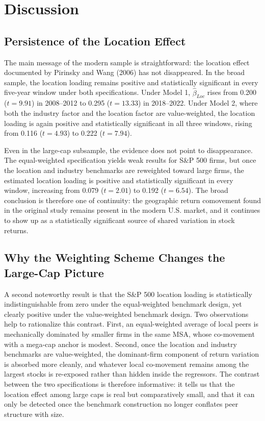 \documentclass[
  12pt,
]{article}
\begin{document}
\section{Discussion}\label{discussion}

\subsection{Persistence of the Location
Effect}\label{persistence-of-the-location-effect}

The main message of the modern sample is straightforward: the location
effect documented by Pirinsky and Wang (2006) has not disappeared. In
the broad sample, the location loading remains positive and
statistically significant in every five-year window under both
specifications. Under Model 1, \(\hat{\beta}_{Loc}\) rises from 0.200
(\(t=9.91\)) in 2008--2012 to 0.295 (\(t=13.33\)) in 2018--2022. Under
Model 2, where both the industry factor and the location factor are
value-weighted, the location loading is again positive and statistically
significant in all three windows, rising from 0.116 (\(t=4.93\)) to
0.222 (\(t=7.94\)).

Even in the large-cap subsample, the evidence does not point to
disappearance. The equal-weighted specification yields weak results for
S\&P 500 firms, but once the location and industry benchmarks are
reweighted toward large firms, the estimated location loading is
positive and statistically significant in every window, increasing from
0.079 (\(t=2.01\)) to 0.192 (\(t=6.54\)). The broad conclusion is
therefore one of continuity: the geographic return comovement found in
the original study remains present in the modern U.S. market, and it
continues to show up as a statistically significant source of shared
variation in stock returns.

\subsection{Why the Weighting Scheme Changes the Large-Cap
Picture}\label{why-the-weighting-scheme-changes-the-large-cap-picture}

A second noteworthy result is that the S\&P 500 location loading is
statistically indistinguishable from zero under the equal-weighted
benchmark design, yet clearly positive under the value-weighted
benchmark design. Two observations help to rationalize this contrast.
First, an equal-weighted average of local peers is mechanically
dominated by smaller firms in the same MSA, whose co-movement with a
mega-cap anchor is modest. Second, once the location and industry
benchmarks are value-weighted, the dominant-firm component of return
variation is absorbed more cleanly, and whatever local co-movement
remains among the largest stocks is re-exposed rather than hidden inside
the regressors. The contrast between the two specifications is therefore
informative: it tells us that the location effect among large caps is
real but comparatively small, and that it can only be detected once the
benchmark construction no longer conflates peer structure with size.
\end{document}
